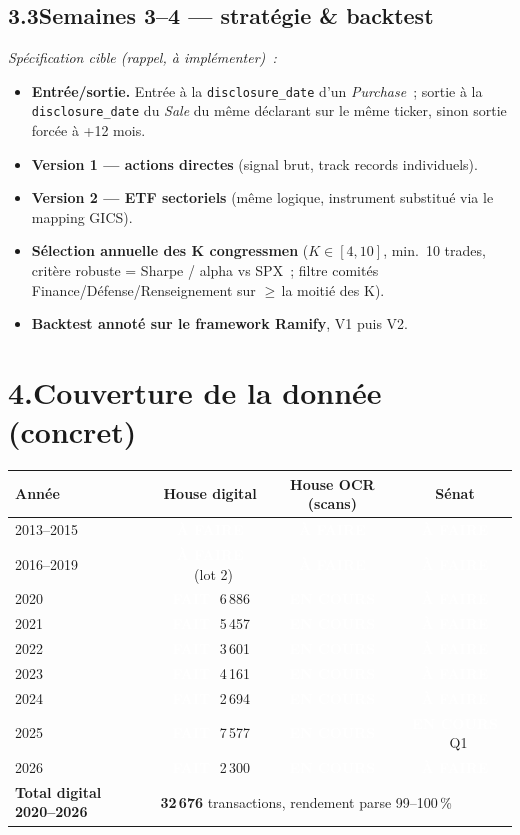\documentclass[11pt,a4paper]{article}
\newcommand{\file}[1]{\texttt{\small #1}}
\newcommand{\nb}[1]{\textbf{#1}}
\newcommand{\badge}[2]{\colorbox{#1}{\textcolor{white}{\scriptsize\textbf{\,#2\,}}}}
\newcommand{\FAIT}{\badge{okgreen}{FAIT}}
\newcommand{\ENCOURS}{\badge{warn}{EN COURS}}
\newcommand{\AFAIRE}{\badge{todo}{\`A FAIRE}}
\begin{document}
\subsection*{3.3\quad Semaines 3--4 --- strat\'egie \& backtest}

\noindent\emph{Sp\'ecification cible (rappel, \`a impl\'ementer)~:}
\begin{itemize}
\item[\AFAIRE] \textbf{Entr\'ee/sortie.} Entr\'ee \`a la \file{disclosure\_date} d'un \emph{Purchase}~;
sortie \`a la \file{disclosure\_date} du \emph{Sale} du m\^eme d\'eclarant sur le m\^eme ticker, sinon
sortie forc\'ee \`a +12 mois.
\item[\AFAIRE] \textbf{Version 1 --- actions directes} (signal brut, track records individuels).
\item[\AFAIRE] \textbf{Version 2 --- ETF sectoriels} (m\^eme logique, instrument substitu\'e via le
mapping GICS).
\item[\AFAIRE] \textbf{S\'election annuelle des K congressmen} ($K\!\in\![4,10]$, min.\ 10 trades,
crit\`ere robuste = Sharpe / alpha vs SPX~; filtre comit\'es Finance/D\'efense/Renseignement sur
$\geq$\,la moiti\'e des K).
\item[\AFAIRE] \textbf{Backtest annot\'e sur le framework Ramify}, V1 puis V2.
\end{itemize}

\section*{4.\quad Couverture de la donn\'ee (concret)}

{\renewcommand{\arraystretch}{1.25}
\begin{center}
\begin{tabular}{l c c c}
\toprule
\textbf{Ann\'ee} & \textbf{House digital} & \textbf{House OCR (scans)} & \textbf{S\'enat} \\
\midrule
2013--2015 & \AFAIRE & \AFAIRE & \AFAIRE \\
2016--2019 & \AFAIRE\ \scriptsize(lot 2) & \AFAIRE & \AFAIRE \\
2020 & \FAIT\ \scriptsize 6\,886 & \ENCOURS & \AFAIRE \\
2021 & \FAIT\ \scriptsize 5\,457 & \ENCOURS & \AFAIRE \\
2022 & \FAIT\ \scriptsize 3\,601 & \ENCOURS & \AFAIRE \\
2023 & \FAIT\ \scriptsize 4\,161 & \ENCOURS & \AFAIRE \\
2024 & \FAIT\ \scriptsize 2\,694 & \ENCOURS & \AFAIRE \\
2025 & \FAIT\ \scriptsize 7\,577 & \ENCOURS & \ENCOURS\ \scriptsize Q1 \\
2026 & \FAIT\ \scriptsize 2\,300 & \ENCOURS & \AFAIRE \\
\midrule
\textbf{Total digital 2020--2026} & \multicolumn{3}{l}{\nb{32\,676} transactions, rendement parse 99--100\,\%} \\
\bottomrule
\end{tabular}
\end{center}}
\end{document}

